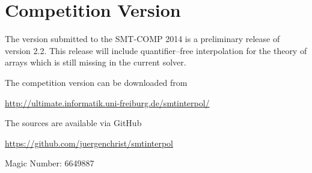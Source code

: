 \documentclass{article}
\begin{document}
\section*{Competition Version}
The version submitted to the SMT-COMP 2014 is a preliminary release of version
2.2.  This release will include quantifier--free interpolation for the theory
of arrays which is still missing in the current solver.

The competition version can be downloaded from
\begin{center}
  \url{http://ultimate.informatik.uni-freiburg.de/smtinterpol/}
\end{center}
The sources are available via GitHub
\begin{center}
  \url{https://github.com/juergenchrist/smtinterpol}
\end{center}

Magic Number: 6649887



\end{document}
